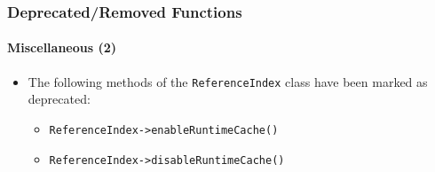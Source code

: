%

\begin{frame}[fragile]
	\frametitle{Deprecated/Removed Functions}
	\framesubtitle{Miscellaneous (2)}

	\begin{itemize}
		\item The following methods of the \texttt{ReferenceIndex} class have been marked as deprecated:
			\begin{itemize}\small
				\item \texttt{ReferenceIndex->enableRuntimeCache()}
				\item \texttt{ReferenceIndex->disableRuntimeCache()}
			\end{itemize}\normalsize

	\end{itemize}

\end{frame}

